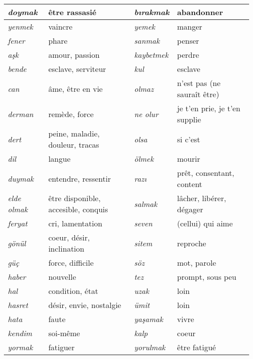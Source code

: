 \documentclass{cours}
\newcommand{\ch}{\c{s}}
\begin{document}
\begin{longtable}{>{\it}p{}p{}|>{\it}p{}p{}}
    \midrule
    doymak           & être rassasié                       & b\i rakmak     & abandonner                    \\
    \midrule
    yenmek           & vaincre                             & yemek          & manger                        \\
    \midrule
    fener            & phare                               & sanmak         & penser                        \\
    \midrule
    a\ch k           & amour, passion                      & kaybetmek      & perdre                        \\
    \midrule
    bende            & esclave, serviteur                  & kul            & esclave                       \\
    \midrule
    can              & âme, être en vie                    & olmaz          & n'est pas (ne sauraît être)   \\
    \midrule
    derman           & remède, force                       & ne olur        & je t'en prie, je t'en supplie \\
    dert             & peine, maladie, douleur, tracas     & olsa           & si c'est                      \\
    \midrule
    dil              & langue                              & ölmek          & mourir                        \\
    \midrule
    duymak           & entendre, ressentir                 & raz\i          & prêt, consentant, content     \\
    \midrule
    elde olmak       & être disponible, accesible, conquis & salmak         & lâcher, libérer, dégager      \\
    \midrule
    feryat           & cri, lamentation                    & seven          & (cellui) qui aime             \\
    \midrule
    gönül            & coeur, désir, inclination           & sitem          & reproche                      \\
    \midrule
    güç              & force, difficile                    & söz            & mot, parole                   \\
    \midrule
    haber            & nouvelle                            & tez            & prompt, sous peu              \\
    \midrule
    hal              & condition, état                     & uzak           & loin                          \\
    \midrule
    hasret           & désir, envie, nostalgie             & ümit           & loin                          \\
    \midrule
    hata             & faute                               & ya\ch amak     & vivre                         \\
    \midrule
    kendim           & soi-même                            & kalp           & coeur                         \\
    \midrule
    yormak           & fatiguer                            & yorulmak       & être fatigué
\end{longtable}
\end{document}
